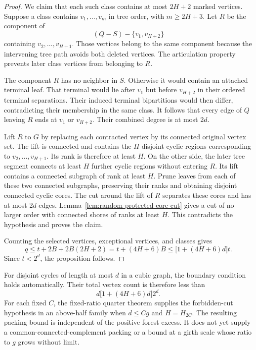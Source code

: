 \begin{proof}
We claim that each such class contains at most $2H+2$ marked vertices.
Suppose a class contains $v_1,\ldots,v_m$ in tree order, with $m\ge2H+3$.
Let $R$ be the component of
\[
 (Q-S)-\{v_1,v_{H+2}\}
\]
containing $v_2,\ldots,v_{H+1}$.
Those vertices belong to the same component because the intervening tree path avoids both deleted vertices.
The articulation property prevents later class vertices from belonging to $R$.

The component $R$ has no neighbor in $S$.
Otherwise it would contain an attached terminal leaf.
That terminal would lie after $v_1$ but before $v_{H+2}$ in their ordered terminal separations.
Their induced terminal bipartitions would then differ, contradicting their membership in the same class.
It follows that every edge of $Q$ leaving $R$ ends at $v_1$ or $v_{H+2}$.
Their combined degree is at most $2d$.

Lift $R$ to $G$ by replacing each contracted vertex by its connected original vertex set.
The lift is connected and contains the $H$ disjoint cyclic regions corresponding to $v_2,\ldots,v_{H+1}$.
Its rank is therefore at least $H$.
On the other side, the later tree segment connects at least $H$ further cyclic regions without entering $R$.
Its lift contains a connected subgraph of rank at least $H$.
Prune leaves from each of these two connected subgraphs, preserving their ranks and obtaining disjoint connected cyclic cores.
The cut around the lift of $R$ separates these cores and has at most $2d$ edges.
Lemma~\ref{lem:random-protected-core-cut} gives a cut of no larger order with connected shores of ranks at least $H$.
This contradicts the hypothesis and proves the claim.

Counting the selected vertices, exceptional vertices, and classes gives
\[
 q\le t+2B+2B(2H+2)
   =t+(4H+6)B
   \le\bigl[1+(4H+6)d\bigr]t.
\]
Since $t<2^d$, the proposition follows.
\end{proof}

For disjoint cycles of length at most $d$ in a cubic graph, the boundary condition holds automatically.
Their total vertex count is therefore less than
\[
 d\bigl[1+(4H+6)d\bigr]2^d.
\]
For each fixed $C$, the fixed-ratio quarter theorem supplies the forbidden-cut hypothesis in an above-half family when $d\le Cg$ and $H=H_{2C}$.
The resulting packing bound is independent of the positive forest excess.
It does not yet supply a common-connected-complement packing or a bound at a girth scale whose ratio to $g$ grows without limit.
